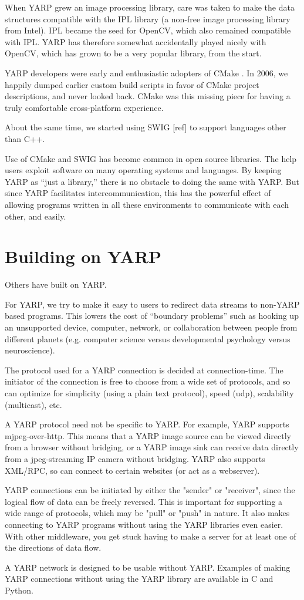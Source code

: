 \documentclass[letterpaper]{article}
\begin{document}
When YARP grew an image processing library, care was taken to make the
data structures compatible with the IPL library (a non-free image
processing library from Intel).  IPL became the seed for OpenCV, which
also remained compatible with IPL. YARP has therefore somewhat
accidentally played nicely with OpenCV, which has grown to be a very
popular library, from the start.

YARP developers were early and enthusiastic adopters of CMake
\cite{fitzpatrick10cmaking}.  In 2006, we happily dumped
earlier custom build scripts in favor of CMake project descriptions,
and never looked back.  CMake was this missing piece for having a
truly comfortable cross-platform experience.

About the same time, we started using SWIG [ref] to support languages
other than C++.

Use of CMake and SWIG has become common in open source libraries.
The help users exploit software on many operating systems and 
languages.  By keeping YARP as ``just a library,'' there is no
obstacle to doing the same with YARP.  But since YARP facilitates
intercommunication, this has the powerful effect of allowing 
programs written in all these environments to communicate with
each other, and easily.



\section{Building on YARP}

Others have built on YARP.


For YARP, we try to make it easy to users to redirect data streams to
non-YARP based programs.  This lowers the cost of ``boundary
problems'' such as hooking up an unsupported device, computer,
network, or collaboration between people from different planets
(e.g. computer science versus developmental psychology versus
neuroscience).

The protocol used for a YARP connection is decided at connection-time.
The initiator of the connection is free to choose from a wide set of
protocols, and so can optimize for simplicity (using a plain text
protocol), speed (udp), scalability (multicast), etc.

A YARP protocol need not be specific to YARP.  For example, YARP
supports mjpeg-over-http.  This means that a YARP image source can be
viewed directly from a browser without bridging, or a YARP image sink
can receive data directly from a jpeg-streaming IP camera without
bridging.  YARP also supports XML/RPC, so can connect to certain
websites (or act as a webserver).

YARP connections can be initiated by either the "sender" or
"receiver", since the logical flow of data can be freely reversed.
This is important for supporting a wide range of protocols, which may
be "pull" or "push" in nature.  It also makes connecting to YARP
programs without using the YARP libraries even easier.  With other
middleware, you get stuck having to make a server for at least one of
the directions of data flow.

A YARP network is designed to be usable without YARP.  Examples of
making YARP connections without using the YARP library are available
in C and Python.
\end{document}
